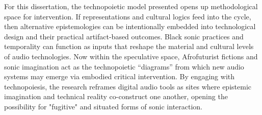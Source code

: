 For this dissertation, the technopoietic model presented opens up methodological space for intervention. If representations and cultural logics feed into the cycle, then alternative epistemologies can be intentionally embedded into technological design and their practical artifact-based outcomes. Black sonic practices and temporality can function as inputs that reshape the material and cultural levels of audio technologies. Now within the speculative space, Afrofuturist fictions and sonic imagination act as the technopoietic “diagrams” from which new audio systems may emerge via embodied critical intervention. By engaging with technopoiesis, the research reframes digital audio tools as sites where epistemic imagination and technical reality co-construct one another, opening the possibility for "fugitive" and situated forms of sonic interaction.

